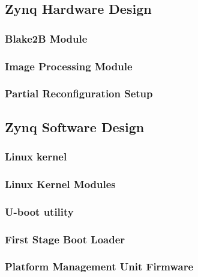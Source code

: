 \subsection{Zynq Hardware Design}\label{ssec:zynqhardwaredesign}

%
\subsubsection{Blake2B Module}\label{sssec:blake2bmodule}

%
\subsubsection{Image Processing Module}\label{sssec:imageprocessingmodule}

%
\subsubsection{Partial Reconfiguration Setup}\label{sssec:partialreconfigurationsetup}



\subsection{Zynq Software Design}\label{ssec:zynqsoftwaredesign}

%
\subsubsection{Linux kernel}\label{sssec:linuxkernel}

%
\subsubsection{Linux Kernel Modules}\label{sssec:linuxkernelmodules}

%
\subsubsection{U-boot utility}\label{sssec:uboot}

%
\subsubsection{First Stage Boot Loader}\label{sssec:fsbl}

%
\subsubsection{Platform Management Unit Firmware}\label{sssec:pmufw}

%
